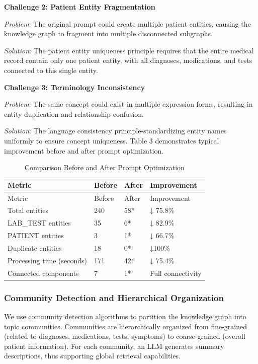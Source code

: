 \documentclass[11pt]{article}
\begin{document}
\textbf{Challenge 2: Patient Entity Fragmentation}

\emph{Problem}: The original prompt could create multiple patient entities, causing the knowledge graph to fragment into multiple disconnected subgraphs.

\emph{Solution}: The patient entity uniqueness principle requires that the entire medical record contain only one patient entity, with all diagnoses, medications, and tests connected to this single entity.

\textbf{Challenge 3: Terminology Inconsistency}

\emph{Problem}: The same concept could exist in multiple expression forms, resulting in entity duplication and relationship confusion.

\emph{Solution}: The language consistency principle-standardizing entity names uniformly to ensure concept uniqueness. Table 3 demonstrates typical improvement before and after prompt optimization.

\begin{longtable}[]{@{}llll@{}}
\caption{Comparison Before and After Prompt Optimization}\tabularnewline
\toprule\noalign{}
Metric & Before & After & Improvement \\
\midrule\noalign{}
\endfirsthead
\toprule\noalign{}
Metric & Before & After & Improvement \\
\midrule\noalign{}
\endhead
\bottomrule\noalign{}
\endlastfoot
Total entities & 240 & 58* & ↓ 75.8\% \\
LAB\_TEST entities & 35 & 6* & ↓ 82.9\% \\
PATIENT entities & 3 & 1* & ↓ 66.7\% \\
Duplicate entities & 18 & 0* & ↓100\% \\
Processing time (seconds) & 171 & 42* & ↓ 75.4\% \\
Connected components & 7 & 1* & Full connectivity \\
\end{longtable}

\subsubsection{Community Detection and Hierarchical Organization}

We use community detection algorithms to partition the knowledge graph into topic communities. Communities are hierarchically organized from fine-grained (related to diagnoses, medications, tests, symptoms) to coarse-grained (overall patient information). For each community, an LLM generates summary descriptions, thus supporting global retrieval capabilities.
\end{document}
